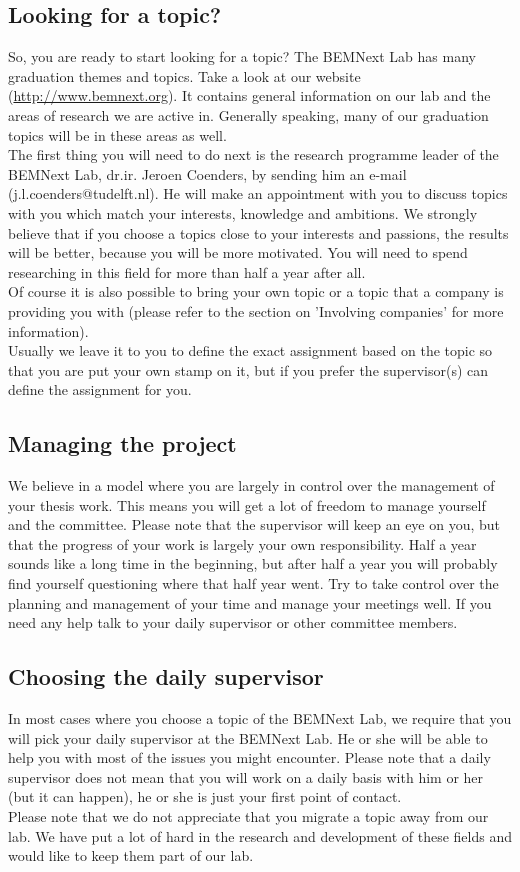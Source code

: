 \documentclass{latex-format/stylesheets/BEMNextstyle}
\begin{document}
\subsection*{Looking for a topic?}
So, you are ready to start looking for a topic? The BEMNext Lab has many graduation themes and topics. Take a look at our website (\url{http://www.bemnext.org}). It contains general information on our lab and the areas of research we are active in. Generally speaking, many of our graduation topics will be in these areas as well.\\
The first thing you will need to do next is the research programme leader of the BEMNext Lab, dr.ir. Jeroen Coenders, by sending him an e-mail (j.l.coenders@tudelft.nl). He will make an appointment with you to discuss topics with you which match your interests, knowledge and ambitions. We strongly believe that if you choose a topics close to your interests and passions, the results will be better, because you will be more motivated. You will need to spend researching in this field for more than half a year after all.\\
Of course it is also possible to bring your own topic or a topic that a company is providing you with (please refer to the section on 'Involving companies' for more information).\\
Usually we leave it to you to define the exact assignment based on the topic so that you are put your own stamp on it, but if you prefer the supervisor(s) can define the assignment for you.

\subsection*{Managing the project}
We believe in a model where you are largely in control over the management of your thesis work. This means you will get a lot of freedom to manage yourself and the committee. Please note that the supervisor will keep an eye on you, but that the progress of your work is largely your own responsibility. Half a year sounds like a long time in the beginning, but after half a year you will probably find yourself questioning where that half year went. Try to take control over the planning and management of your time and manage your meetings well. If you need any help talk to your daily supervisor or other committee members.

\subsection*{Choosing the daily supervisor}
In most cases where you choose a topic of the BEMNext Lab, we require that you will pick your daily supervisor at the BEMNext Lab. He or she will be able to help you with most of the issues you might encounter. Please note that a daily supervisor does not mean that you will work on a daily basis with him or her (but it can happen), he or she is just your first point of contact.\\
Please note that we do not appreciate that you migrate a topic away from our lab. We have put a lot of hard in the research and development of these fields and would like to keep them part of our lab.
\end{document}
